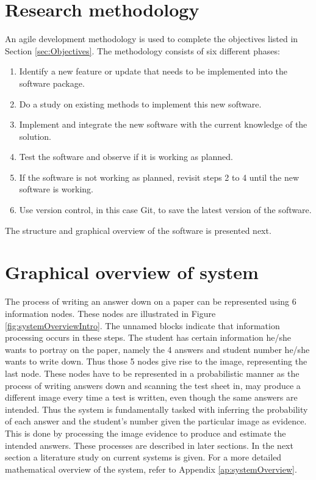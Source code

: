 \section{Research methodology}

An agile development methodology is used to complete the objectives listed in Section \ref{sec:Objectives}. The methodology consists of six different phases:
\begin{enumerate}
\item Identify a new feature or update that needs to be implemented into the software package.
\item Do a study on existing methods to implement this new software.
\item Implement and integrate the new software with the current knowledge of the solution.
\item Test the software and observe if it is working as planned.
\item If the software is not working as planned, revisit steps 2 to 4 until the new software is working.
\item Use version control, in this case Git, to save the latest version of the software.
\end{enumerate}


The structure and graphical overview of the software is presented next.

\section{Graphical overview of system}
The process of writing an answer down on a paper can be represented using 6 information nodes. These nodes are illustrated in Figure \ref{fig:systemOverviewIntro}. The unnamed blocks indicate that information processing occurs in these steps. The student has certain information he/she wants to portray on the paper, namely the 4 answers and student number he/she wants to write down. Thus those 5 nodes give rise to the image, representing the last node. These nodes have to be represented in a probabilistic manner as the process of writing answers down and scanning the test sheet in, may produce a different image every time a test is written, even though the same answers are intended. Thus the system is fundamentally tasked with inferring the probability of each answer and the student's number given the particular image as evidence. This is done by processing the image evidence to produce and estimate the intended answers. These processes are described in later sections. In the next section a literature study on current systems is given. For a more detailed mathematical overview of the system, refer to Appendix \ref{ap:systemOverview}.

